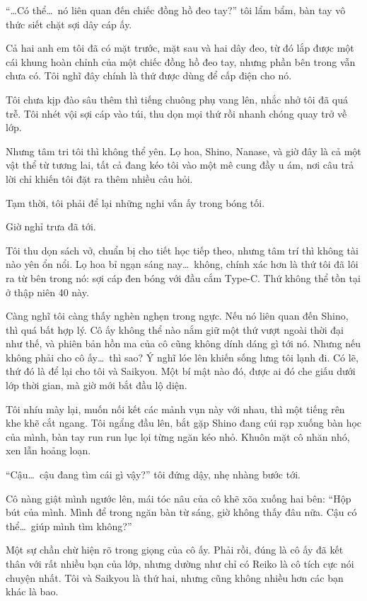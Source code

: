 \documentclass[../main.tex]{subfiles}
\begin{document}
``\dots Có thể\dots\ nó liên quan đến chiếc đồng hồ đeo tay?'' tôi lẩm bẩm, bàn tay vô thức siết chặt sợi dây cáp ấy.

Cả hai anh em tôi đã có mặt trước, mặt sau và hai dây đeo, từ đó lắp được một cái khung hoàn chỉnh của một chiếc đồng hồ đeo tay, nhưng phần bên trong vẫn chưa có. Tôi nghĩ đây chính là thứ được dùng để cấp điện cho nó.

Tôi chưa kịp đào sâu thêm thì tiếng chuông phụ vang lên, nhắc nhở tôi đã quá trễ. Tôi nhét vội sợi cáp vào túi, thu dọn mọi thứ rồi nhanh chóng quay trở về lớp.

Nhưng tâm tri tôi thì không thể yên. Lọ hoa, Shino, Nanase, và giờ đây là cả một vật thể từ tương lai, tất cả đang kéo tôi vào một mê cung đầy u ám, nơi câu trả lời chỉ khiến tôi đặt ra thêm nhiều câu hỏi.

Tạm thời, tôi phải để lại những nghi vấn ấy trong bóng tối.

\ct

Giờ nghỉ trưa đã tới.

Tôi thu dọn sách vở, chuẩn bị cho tiết học tiếp theo, nhưng tâm trí thì không tài nào yên ổn nổi. Lọ hoa bỉ ngạn sáng nay\dots\ không, chính xác hơn là thứ tôi đã lôi ra từ bên trong nó: sợi cáp đen bóng với đầu cắm Type-C. Thứ không thể tồn tại ở thập niên 40 này.

Càng nghĩ tôi càng thấy nghèn nghẹn trong ngực. Nếu nó liên quan đến Shino, thì quá bất hợp lý. Cô ấy không thể nào nắm giữ một thứ vượt ngoài thời đại như thế, và phiên bản hồn ma của cô cũng không dính dáng gì tới nó. Nhưng nếu không phải cho cô ấy\dots\ thì sao? Ý nghĩ lóe lên khiến sống lưng tôi lạnh đi. Có lẽ, thứ đó là để lại cho tôi và Saikyou. Một bí mật nào đó, được ai đó che giấu dưới lớp thời gian, mà giờ mới bắt đầu lộ diện.

Tôi nhíu mày lại, muốn nối kết các mảnh vụn này với nhau, thì một tiếng rên khe khẽ cắt ngang. Tôi ngẩng đầu lên, bắt gặp Shino đang cúi rạp xuống bàn học của mình, bàn tay run run lục lọi từng ngăn kéo nhỏ. Khuôn mặt cô nhăn nhó, xen lẫn hoảng loạn.

``Cậu\dots\ cậu đang tìm cái gì vậy?'' tôi đứng dậy, nhẹ nhàng bước tới.

Cô nàng giật mình ngước lên, mái tóc nâu của cô khẽ xõa xuống hai bên: ``Hộp bút của mình. Mình để trong ngăn bàn từ sáng, giờ không thấy đâu nữa. Cậu có thể\dots\ giúp mình tìm không?''

Một sự chần chừ hiện rõ trong giọng của cô ấy. Phải rồi, đúng là cô ấy đã kết thân với rất nhiều bạn của lớp, nhưng dường như chỉ có Reiko là cô tích cực nói chuyện nhất. Tôi và Saikyou là thứ hai, nhưng cũng không nhiều hơn các bạn khác là bao.
\end{document}
